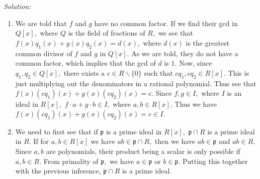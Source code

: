\documentclass[]{article}
\begin{document}
\emph{Solution:} 
\begin{enumerate}
	\item We are told that $f$ and $g$ have no common factor. If we find their gcd in $Q[x],$ where $Q$ is the field of fractions of $R,$ we see that $f(x)q_1(x)+g(x)q_2(x)=d(x),$ where 
	$d(x)$ is the greatest common divisor of $f$ and $g$ in $Q[x].$ As we are told, they do not have a common factor, which implies that the gcd of $d$ is $1.$ Now, since $q_1,q_2 \in Q[x],$ there exists a $c \in R\backslash \{0\}$ such that $cq_1, cq_2 \in R[x].$ This is just multiplying out the denominators in a rational polynomial. Thus see that $f(x)(cq_1)(x)+g(x)(cq_2)(x)=c.$ Since $f,g \in I,$ 
	where $I$ is an ideal in $R[x],$ $f\cdot a+ g \cdot b \in I,$ where $a,b \in R[x]$.  Thus we have $f(x)(cq_1)(x)+g(x)(cq_2)(x)=c \in I.$
	\item  We need to first see that if $\mathfrak{p}$ is a prime ideal in $R[x],$ $\mathfrak{p} \cap R $ is a prime ideal in $R$. If for $a,b \in R[x]$ we have $ab \in \mathfrak{p} \cap R,$ then we have $ab \in \mathfrak{p}$ and $ab \in R.$ Since $a,b$ are polynomials, their product being a scalar is only possible if $a,b \in R.$ From primality of $ \mathfrak{p},$ we have $a \in \mathfrak{p}$ or $b \in \mathfrak{p}.$ Putting this together with the previous inference, $\mathfrak{p}\cap R$ is a prime ideal. 
	

\end{enumerate}
\end{document}
